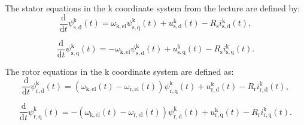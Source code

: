 \begin{solutionblock}
    The stator equations in the k coordinate system from the lecture are defined by:
    \begin{equation}
        \frac{\mathrm{d}}{\mathrm{d}t} \psi_{\mathrm{s,d}}^{\mathrm{k}}(t) = \omega_{\mathrm{k,el}} \psi_{\mathrm{s,q}}^{\mathrm{k}}(t) + u_{\mathrm{s,d}}^{\mathrm{k}}(t) - R_{\mathrm{s}} i_{\mathrm{s,d}}^{\mathrm{k}}(t),
        \label{eq:ode_stator_d}
    \end{equation}

    \begin{equation}
        \frac{\mathrm{d}}{\mathrm{d}t} \psi_{\mathrm{s,q}}^{\mathrm{k}}(t) = - \omega_{\mathrm{k,el}} \psi_{\mathrm{s,d}}^{\mathrm{k}}(t) + u_{\mathrm{s,q}}^{\mathrm{k}}(t) - R_{\mathrm{s}} i_{\mathrm{s,q}}^{\mathrm{k}}(t).
    \end{equation}


    The rotor equations in the k coordinate system are defined as: 
    \begin{equation}
        \frac{\mathrm{d}}{\mathrm{d}t} \psi_{\mathrm{r,d}}^{\mathrm{k}}(t) = (\omega_{\mathrm{k,el}}(t)-\omega_{\mathrm{r,el}}(t))\psi_{\mathrm{r,q}}^{\mathrm{k}}(t) + u_{\mathrm{r,d}}^{\mathrm{k}}(t) - R_{\mathrm{r}}i_{\mathrm{r,d}}^{\mathrm{k}}(t),
        \label{eq:ode_rotor_d}
    \end{equation}

    \begin{equation}
        \frac{\mathrm{d}}{\mathrm{d}t} \psi_{\mathrm{r,q}}^{\mathrm{k}}(t) = -(\omega_{\mathrm{k,el}}(t)-\omega_{\mathrm{r,el}}(t))\psi_{\mathrm{r,d}}^{\mathrm{k}}(t) + u_{\mathrm{r,q}}^{\mathrm{k}}(t) - R_{\mathrm{r}}i_{\mathrm{r,q}}^{\mathrm{k}}(t).
    \end{equation}
    

\end{solutionblock}
